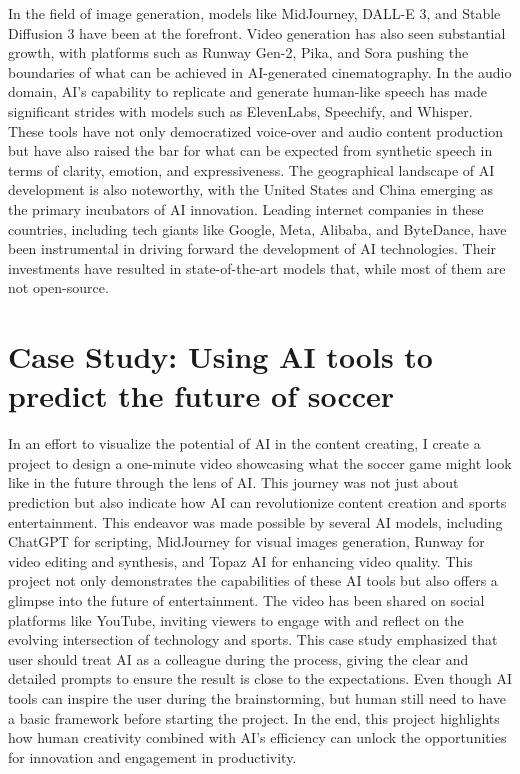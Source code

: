 \documentclass[11pt,a4paper,oneside]{report}
\begin{document}
In the field of image generation, models like MidJourney, DALL-E 3, and Stable Diffusion 3 have been at the forefront. 
Video generation has also seen substantial growth, with platforms such as Runway Gen-2, Pika, and Sora pushing the boundaries of what can be achieved in AI-generated cinematography. 
In the audio domain, AI's capability to replicate and generate human-like speech has made significant strides with models such as ElevenLabs, Speechify, and Whisper. 
These tools have not only democratized voice-over and audio content production but have also raised the bar for what can be expected from synthetic speech in terms of clarity, emotion, and expressiveness. 
The geographical landscape of AI development is also noteworthy, with the United States and China emerging as the primary incubators of AI innovation. 
Leading internet companies in these countries, including tech giants like Google, Meta, Alibaba, and ByteDance, have been instrumental in driving forward the development of AI technologies. 
Their investments have resulted in state-of-the-art models that, while most of them are not open-source.

\section{Case Study: Using AI tools to predict the future of soccer}
In an effort to visualize the potential of AI in the content creating, I create a project to design a one-minute video showcasing what the soccer game might look like in the future through the lens of AI. 
This journey was not just about prediction but also indicate how AI can revolutionize content creation and sports entertainment.
This endeavor was made possible by several AI models, including ChatGPT for scripting, MidJourney for visual images generation, Runway for video editing and synthesis, and Topaz AI for enhancing video quality. 
This project not only demonstrates the capabilities of these AI tools but also offers a glimpse into the future of entertainment. 
The video has been shared on social platforms like YouTube, inviting viewers to engage with and reflect on the evolving intersection of technology and sports.
This case study emphasized that user should treat AI as a colleague during the process, giving the clear and detailed prompts to ensure the result is close to the expectations.
Even though AI tools can inspire the user during the brainstorming, but human still need to have a basic framework before starting the project.
In the end, this project highlights how human creativity combined with AI's efficiency can unlock the opportunities for innovation and engagement in productivity.
\end{document}
